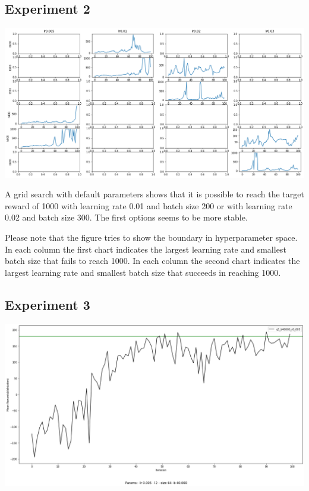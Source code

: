 \documentclass[11pt]{article}
\begin{document}
    \subsection{Experiment 2}

    \hspace*{-0.5in}
    \includegraphics[scale=0.35]{q2_grid_plot}

    A grid search with default parameters shows that it is possible to reach the target reward of 1000 with learning rate 0.01 and batch size 200 or with learning rate 0.02 and batch size 300.
    The first options seems to be more stable.

    Please note that the figure tries to show the boundary in hyperparameter space.
    In each column the first chart indicates the largest learning rate and smallest batch size that fails to reach 1000.
    In each column the second chart indicates the largest learning rate and smallest batch size that succeeds in reaching 1000.

    \subsection{Experiment 3}

    \hspace*{-0.5in}
    \includegraphics[scale=0.35]{q3/q3_b40000_r0.005_mean_rewards}
\end{document}
